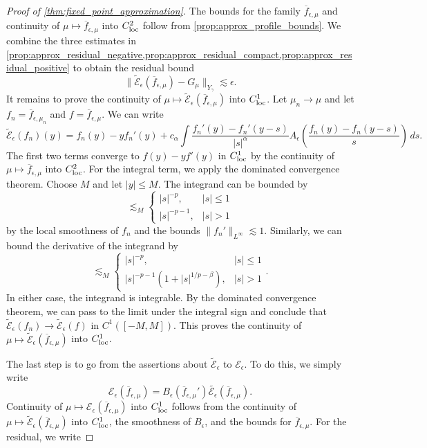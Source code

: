 \documentclass[11pt]{amsart}
\theoremstyle{definition}
\theoremstyle{remark}
\numberwithin{equation}{section}
\newcommand{\sq}[1]{\widetilde{#1}}
\newcommand{\mc}[1]{\mathcal{#1}}
\newcommand{\ov}[1]{\overline{#1}}
\begin{document}
\begin{proof}[Proof of \cref{thm:fixed_point_approximation}]
    The bounds for the family $\ov{f}_{\epsilon, \mu}$ and continuity of $\mu \mapsto \ov{f}_{\epsilon, \mu}$ into $C^{2}_{\textup{loc}}$ follow from \cref{prop:approx_profile_bounds}. We combine the three estimates in \cref{prop:approx_residual_negative,prop:approx_residual_compact,prop:approx_residual_positive} to obtain the residual bound
    \[\|\sq{\mc{E}}_\epsilon(\ov{f}_{\epsilon, \mu}) - G_\mu\|_{Y_\gamma} \lesssim \epsilon.\]
    It remains to prove the continuity of $\mu \mapsto \sq{\mc{E}}_\epsilon(\ov{f}_{\epsilon, \mu})$ into $C^{1}_{\textup{loc}}$. Let $\mu_n \to \mu$ and let $f_n = \ov{f}_{\epsilon, \mu_n}$ and $f = \ov{f}_{\epsilon, \mu}$. We can write
    \[\sq{\mc{E}}_\epsilon(f_n)(y) = f_n(y) - yf_n'(y) + c_\alpha \int \frac{f_n'(y) - f_n'(y-s)}{|s|^{\alpha}}A_\epsilon \left(\frac{f_n(y) - f_n(y - s)}{s}\right) \, ds.\]
    The first two terms converge to $f(y) - yf'(y)$ in $C^1_{\textup{loc}}$ by the continuity of $\mu \mapsto \ov{f}_{\epsilon, \mu}$ into $C^{2}_{\textup{loc}}$. For the integral term, we apply the dominated convergence theorem. Choose $M$ and let $|y| \leq M$. The integrand can be bounded by
    \[ \lesssim_M \begin{cases}
        |s|^{-p}, & |s| \leq 1 \\
        |s|^{-p - 1}, & |s| > 1
    \end{cases}\]
    by the local smoothness of $f_n$ and the bounds $\|f_n'\|_{L^\infty} \lesssim 1$. Similarly, we can bound the derivative of the integrand by
    \[ \lesssim_M \begin{cases}
        |s|^{-p}, & |s| \leq 1 \\
        |s|^{-p - 1}(1 + |s|^{1/p - \beta}), & |s| > 1
    \end{cases}.\]
    In either case, the integrand is integrable. By the dominated convergence theorem, we can pass to the limit under the integral sign and conclude that $\sq{\mc{E}}_\epsilon(f_n) \to \sq{\mc{E}}_\epsilon(f)$ in $C^1([-M,M])$. This proves the continuity of $\mu \mapsto \sq{\mc{E}}_\epsilon(\ov{f}_{\epsilon, \mu})$ into $C^{1}_{\textup{loc}}$. \par
    The last step is to go from the assertions about $\sq{\mc{E}}_\epsilon$ to $\mc{E}_\epsilon$. To do this, we simply write
    \[\mc{E}_\epsilon(\ov{f}_{\epsilon, \mu}) = B_\epsilon(\ov{f}_{\epsilon, \mu}')\sq{\mc{E}_\epsilon}(\ov{f}_{\epsilon, \mu}).\]
    Continuity of $\mu \mapsto \mc{E}_\epsilon(\ov{f}_{\epsilon, \mu})$ into $C^{1}_{\textup{loc}}$ follows from the continuity of $\mu \mapsto \sq{\mc{E}}_\epsilon(\ov{f}_{\epsilon, \mu})$ into $C^{1}_{\textup{loc}}$, the smoothness of $B_\epsilon$, and the bounds for $\ov{f}_{\epsilon, \mu}$. For the residual, we write

\end{proof}
\end{document}
